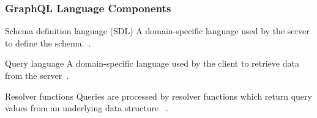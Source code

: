 \begin{frame}\frametitle{GraphQL Language Components}

\begin{block}{Schema definition language (SDL)}
A domain-specific language used by the server to define the schema.~\cite{migrating-to-gql}.
\end{block}

\begin{block}{Query language}
A domain-specific language used by the client to retrieve data from the server~\cite{initial-analysis-of-gql}. 
\end{block}

\begin{block}{Resolver functions}
Queries are processed by resolver functions which return query values from an underlying data structure  ~\cite{migrating-to-gql}.
\end{block}

\end{frame}
